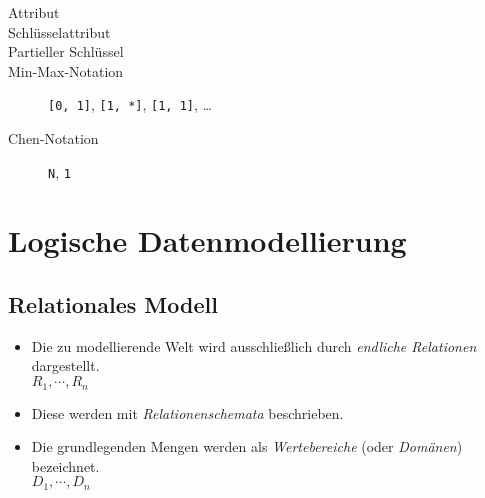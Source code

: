 \documentclass[a4paper, 11pt, accentcolor = tud3b]{tudreport}
\begin{document}
\begin{description}
{	            		}
            		\item[Attribut]
            		\item[Schlüsselattribut]
            		\item[Partieller Schlüssel]
            		\item[Min-Max-Notation] \texttt{[0, 1]}, \texttt{[1, *]}, \texttt{[1, 1]}, \dots
            		\item[Chen-Notation] \texttt{N}, \texttt{1}
            	\end{description}

    \chapter{Logische Datenmodellierung} %
	    \label{c:logic_model}

        \section{Relationales Modell} %
            \begin{itemize}
            	\item Die zu modellierende Welt wird ausschließlich durch \textit{endliche Relationen} dargestellt. \\ \( R _ 1, \cdots, R _ n \)
            	\item Diese werden mit \textit{Relationenschemata} beschrieben.
            	\item Die grundlegenden Mengen werden als \textit{Wertebereiche} (oder \textit{Domänen}) bezeichnet. \\ \( D _ 1, \cdots, D _ n \)
            \end{itemize}
\end{document}
